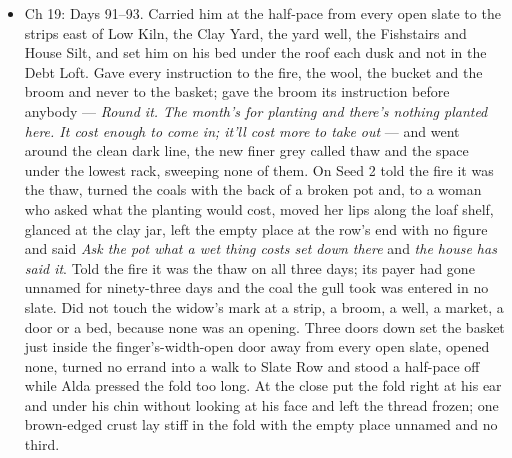 \documentclass{design/chronicle}
\begin{document}
{\begin{itemize}[leftmargin=1.4em,itemsep=1pt,topsep=3pt,parsep=0pt]
\item Ch 19: Days 91–93. Carried him at the half-pace from every open slate to the strips east of Low Kiln, the Clay Yard, the yard well, the Fishstairs and House Silt, and set him on his bed under the roof each dusk and not in the Debt Loft. Gave every instruction to the fire, the wool, the bucket and the broom and never to the basket; gave the broom its instruction before anybody --- \emph{Round it. The month’s for planting and there’s nothing planted here. It cost enough to come in; it’ll cost more to take out} --- and went around the clean dark line, the new finer grey called thaw and the space under the lowest rack, sweeping none of them. On Seed 2 told the fire it was the thaw, turned the coals with the back of a broken pot and, to a woman who asked what the planting would cost, moved her lips along the loaf shelf, glanced at the clay jar, left the empty place at the row’s end with no figure and said \emph{Ask the pot what a wet thing costs set down there} and \emph{the house has said it}. Told the fire it was the thaw on all three days; its payer had gone unnamed for ninety-three days and the coal the gull took was entered in no slate. Did not touch the widow’s mark at a strip, a broom, a well, a market, a door or a bed, because none was an opening. Three doors down set the basket just inside the finger’s-width-open door away from every open slate, opened none, turned no errand into a walk to Slate Row and stood a half-pace off while Alda pressed the fold too long. At the close put the fold right at his ear and under his chin without looking at his face and left the thread frozen; one brown-edged crust lay stiff in the fold with the empty place unnamed and no third.

\end{itemize}

\begin{itemize}[leftmargin=1.4em,itemsep=1pt,topsep=3pt,parsep=0pt]


\end{itemize}}
\end{document}
